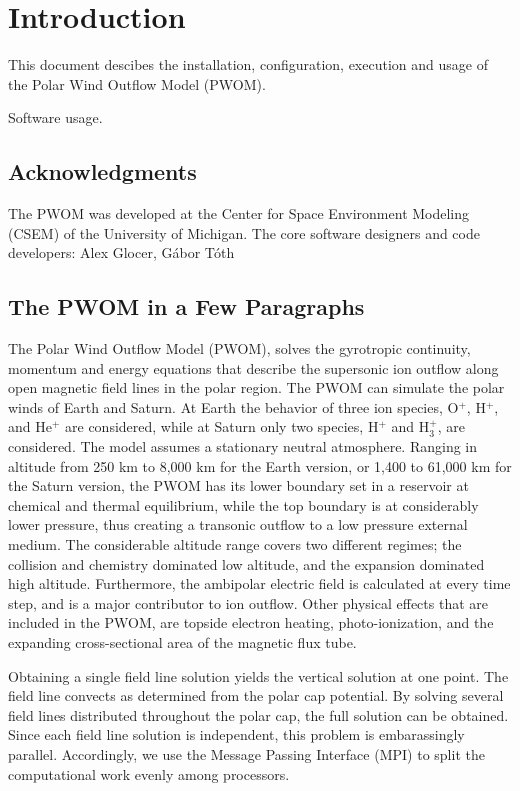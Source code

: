 
\chapter{Introduction}

This document descibes the installation, configuration, execution and 
usage of the Polar Wind Outflow Model (PWOM).

Software usage.

\section{Acknowledgments}

The PWOM was developed at the Center for Space Environment Modeling
(CSEM) of the University of Michigan. 
The core software designers and code developers: Alex Glocer, G\'abor T\'oth

\section{The PWOM in a Few Paragraphs}

The Polar Wind Outflow Model (PWOM), solves the gyrotropic continuity, 
momentum and energy equations that describe the supersonic ion outflow 
along open magnetic field lines in the polar region. The PWOM can simulate 
the polar winds of Earth and Saturn. At Earth the behavior of three ion 
species, O$^{+}$, H$^{+}$, and He$^{+}$ are considered, while at Saturn 
only two species, H$^{+}$ and H$_{3}^{+}$, are considered. The model assumes 
a stationary neutral atmosphere. Ranging in altitude from 250 km to 8,000 km 
for the Earth version, or 1,400 to 61,000 km for the Saturn version, the PWOM 
has its lower boundary set in a reservoir at chemical and thermal equilibrium, 
while the top boundary is at considerably lower pressure, thus creating a 
transonic outflow to a low pressure external medium. The considerable 
altitude range covers two different regimes; the collision and chemistry 
dominated low altitude, and the expansion dominated high altitude. 
Furthermore, the ambipolar electric field is calculated at every time step, 
and is a major contributor to ion outflow. Other physical effects that are 
included in the PWOM, are topside electron heating, photo-ionization, and the 
expanding cross-sectional area of the magnetic flux tube.

Obtaining a single field line solution yields the vertical solution at one 
point. The field line convects as determined from the polar cap potential. 
By solving several field lines distributed  throughout the polar cap, 
the full solution can be obtained. Since each field line solution is 
independent, this problem is embarassingly parallel. Accordingly, 
we use the Message Passing Interface (MPI) to split the computational work 
evenly among processors. 

